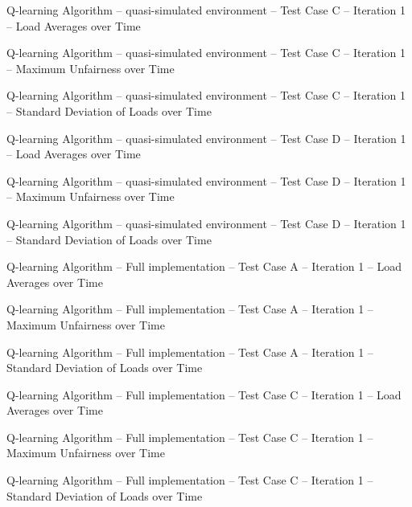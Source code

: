    {Q-learning Algorithm -- quasi-simulated environment -- Test Case C --
   Iteration 1 -- Load Averages over Time}

   {Q-learning Algorithm -- quasi-simulated environment -- Test Case C --
   Iteration 1 -- Maximum Unfairness over Time}

   {Q-learning Algorithm -- quasi-simulated environment -- Test Case C --
   Iteration 1 -- Standard Deviation of Loads over Time}

   {Q-learning Algorithm -- quasi-simulated environment -- Test Case D --
   Iteration 1 -- Load Averages over Time}

   {Q-learning Algorithm -- quasi-simulated environment -- Test Case D --
   Iteration 1 -- Maximum Unfairness over Time}

   {Q-learning Algorithm -- quasi-simulated environment -- Test Case D --
   Iteration 1 -- Standard Deviation of Loads over Time}

   {Q-learning Algorithm -- Full implementation -- Test Case A --
   Iteration 1 -- Load Averages over Time}

   {Q-learning Algorithm -- Full implementation -- Test Case A --
   Iteration 1 -- Maximum Unfairness over Time}

   {Q-learning Algorithm -- Full implementation -- Test Case A --
   Iteration 1 -- Standard Deviation of Loads over Time}

   {Q-learning Algorithm -- Full implementation -- Test Case C --
   Iteration 1 -- Load Averages over Time}

   {Q-learning Algorithm -- Full implementation -- Test Case C --
   Iteration 1 -- Maximum Unfairness over Time}

   {Q-learning Algorithm -- Full implementation -- Test Case C --
   Iteration 1 -- Standard Deviation of Loads over Time}


